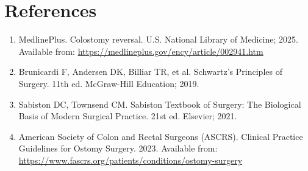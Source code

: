 \section*{References}
\begin{enumerate}
  \item MedlinePlus. Colostomy reversal. U.S. National Library of Medicine; 2025. Available from: \url{https://medlineplus.gov/ency/article/002941.htm}
  
  \item Brunicardi F, Andersen DK, Billiar TR, et al. Schwartz's Principles of Surgery. 11th ed. McGraw-Hill Education; 2019.
  
  \item Sabiston DC, Townsend CM. Sabiston Textbook of Surgery: The Biological Basis of Modern Surgical Practice. 21st ed. Elsevier; 2021.
  
  \item American Society of Colon and Rectal Surgeons (ASCRS). Clinical Practice Guidelines for Ostomy Surgery. 2023. Available from: \url{https://www.fascrs.org/patients/conditions/ostomy-surgery}
\end{enumerate}

\clearpage
